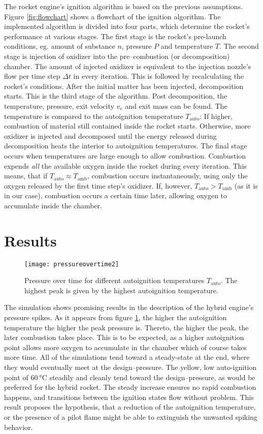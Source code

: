   The rocket engine's ignition algorithm is based on the previous assumptions. Figure \ref{fig:flowchart} shows a flowchart of the ignition algorithm. The implemented algorithm is divided into four parts, which determine the rocket's performance at various stages. The first stage is the rocket's pre-launch conditions, eg. amount of substance $n$, pressure $P$ and temperature $T$. The second stage is injection of oxidizer into the pre--combustion (or decomposition) chamber. The amount of injected oxidizer is equivalent to the injection nozzle's flow per time step $\Delta t$ in every iteration. This is followed by recalculating the rocket's conditions. After the initial matter has been injected, decomposition starts. This is the third stage of the algorithm. Post decomposition, the temperature, pressure, exit velocity $v_e$ and exit mass can be found. The temperature is compared to the autoignition temperature $T_\text{auto}$: If higher, combustion of material still contained inside the rocket starts. Otherwise, more oxidizer is injected and decomposed until the energy released during decomposition heats the interior to autoignition temperatures. The final stage occurs when temperatures are large enough to allow combustion. Combustion expends \emph{all} the available oxygen inside the rocket during every iteration. This means, that if $T_\text{auto} \approx T_\text{amb}$, combustion occurs instantaneously, using only the oxygen released by the first time step's oxidizer. If, however, $T_\text{auto} > T_\text{amb}$ (as it is in our case), combustion occurs a certain time later, allowing oxygen to accumulate inside the chamber.

\section{Results}

  \begin{figure}
  	\centering
  	\texttt{[image: pressureovertime2]}
  	\caption{Pressure over time for different autoignition temperatures $T_\text{auto}$. The highest peak is given by the highest autoignition temperature.}
  	\label{fig:pressureovertime}
  \end{figure}

  The simulation shows promising results in the description of the hybrid engine's pressure spikes. As it appears from figure \ref{fig:pressureovertime}, the higher the autoignition temperature the higher the peak pressure is. Thereto, the higher the peak, the later combustion takes place. This is to be expected, as a higher autoignition point allows more oxygen to accumulate in the chamber which of course takes more time. All of the simulations tend toward a steady-state at the end, where they would eventually meet at the design--pressure. The yellow, low auto-ignition point of $\SI{60}{\celsius}$ steadily and cleanly tend toward the design--pressure, as would be preferred for the hybrid rocket. The steady increase ensures no rapid combustion happens, and transitions between the ignition states flow without problem. This result proposes the hypothesis, that a reduction of the autoignition temperature, or the presence of a pilot flame might be able to extinguish the unwanted spiking behavior.


